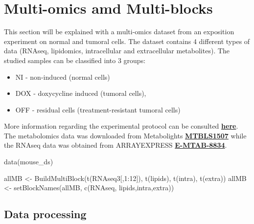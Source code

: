 \documentclass[
]{book}
\newenvironment{Shaded}{\begin{snugshade}}{\end{snugshade}}
\newcommand{\DecValTok}[1]{\textcolor[rgb]{0.00,0.00,0.81}{#1}}
\newcommand{\FunctionTok}[1]{\textcolor[rgb]{0.00,0.00,0.00}{#1}}
\newcommand{\NormalTok}[1]{#1}
\newcommand{\OtherTok}[1]{\textcolor[rgb]{0.56,0.35,0.01}{#1}}
\newcommand{\SpecialCharTok}[1]{\textcolor[rgb]{0.00,0.00,0.00}{#1}}
\newcommand{\StringTok}[1]{\textcolor[rgb]{0.31,0.60,0.02}{#1}}
\providecommand{\tightlist}{%
  \setlength{\itemsep}{0pt}\setlength{\parskip}{0pt}}
\begin{document}
\hypertarget{multi-omics}{%
\chapter{Multi-omics amd Multi-blocks}\label{multi-omics}}

This section will be explained with a multi-omics dataset from an exposition
experiment on normal and tumoral cells. The dataset contains 4 different types
of data (RNAseq, lipidomics, intracellular and extracellular metabolites).
The studied samples can be classified into 3 groups:

\begin{itemize}
\tightlist
\item
  NI - non-induced (normal cells)
\item
  DOX - doxycycline induced (tumoral cells),
\item
  OFF - residual cells (treatment-resistant tumoral cells)
\end{itemize}

More information regarding the experimental protocol can be consulted \href{https://doi.org/10.15252/msb.202010141}{\textbf{here}}. The metabolomics data was
downloaded from Metabolights
\href{https://www.ebi.ac.uk/metabolights/MTBLS1507}{\textbf{MTBLS1507}}
while the RNAseq data was obtained from ARRAYEXPRESS \href{https://www.ebi.ac.uk/arrayexpress/experiments/E-MTAB-8834/}{\textbf{E-MTAB-8834}}.

\begin{Shaded}
\begin{Highlighting}[]
\FunctionTok{data}\NormalTok{(mouse\_ds)}

\NormalTok{allMB }\OtherTok{\textless{}{-}} \FunctionTok{BuildMultiBlock}\NormalTok{(}\FunctionTok{t}\NormalTok{(RNAseq3[,}\DecValTok{1}\SpecialCharTok{:}\DecValTok{12}\NormalTok{]), }\FunctionTok{t}\NormalTok{(lipids), }\FunctionTok{t}\NormalTok{(intra), }\FunctionTok{t}\NormalTok{(extra))}
\NormalTok{allMB }\OtherTok{\textless{}{-}} \FunctionTok{setBlockNames}\NormalTok{(allMB, }\FunctionTok{c}\NormalTok{(}\StringTok{\textquotesingle{}RNAseq\textquotesingle{}}\NormalTok{, }\StringTok{\textquotesingle{}lipids\textquotesingle{}}\NormalTok{,}\StringTok{\textquotesingle{}intra\textquotesingle{}}\NormalTok{,}\StringTok{\textquotesingle{}extra\textquotesingle{}}\NormalTok{))}
\end{Highlighting}
\end{Shaded}

\hypertarget{PART1}{%
\section{Data processing}\label{PART1}}
\end{document}

